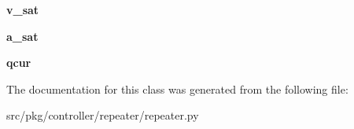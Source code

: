 \begin{DoxyCompactItemize}
\item 
\mbox{\label{classrnb-planning_1_1src_1_1pkg_1_1controller_1_1repeater_1_1repeater_1_1_repeater_ada037f9289417a5410ea6939a91ac51c}} 
{\bfseries v\+\_\+sat}
\item 
\mbox{\label{classrnb-planning_1_1src_1_1pkg_1_1controller_1_1repeater_1_1repeater_1_1_repeater_a7533cf610cb9538233375a8cb6cd1c9c}} 
{\bfseries a\+\_\+sat}
\item 
\mbox{\label{classrnb-planning_1_1src_1_1pkg_1_1controller_1_1repeater_1_1repeater_1_1_repeater_a5e6a709e8f534bf411019d8af0cf449e}} 
{\bfseries qcur}
\end{DoxyCompactItemize}


The documentation for this class was generated from the following file\+:\begin{DoxyCompactItemize}
\item 
src/pkg/controller/repeater/repeater.\+py\end{DoxyCompactItemize}
